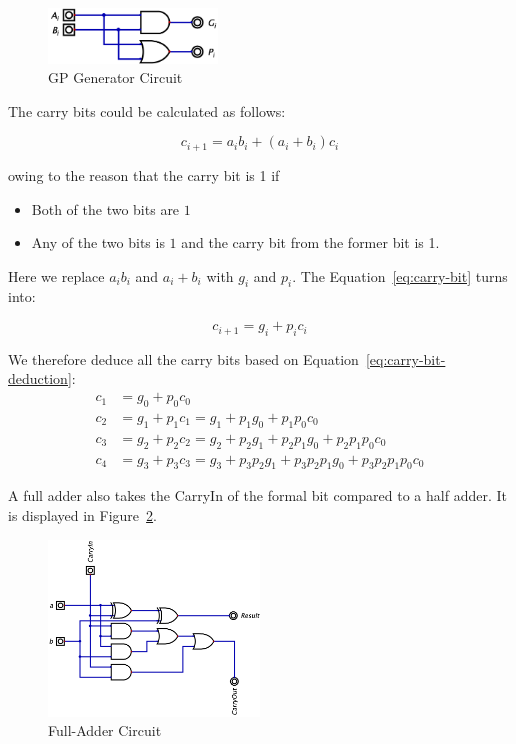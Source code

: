 \documentclass[conference]{IEEEtran}
\begin{document}
\begin{figure}[h!]
\centering
\includegraphics[width=0.4\textwidth]{assets/generate_gp.png}
\caption{GP Generator Circuit}
\label{fig:gp_generator}
\end{figure}

The carry bits could be calculated as follows:

\begin{equation}\label{eq:carry-bit}
    c_{i+1} = a_i b_i + (a_i + b_i) c_i
\end{equation}

owing to the reason that the carry bit is 1 if

\begin{itemize}
    \item Both of the two bits are $1$
    \item Any of the two bits is $1$ and the carry bit from the former bit is 1.
\end{itemize}

Here we replace $a_ib_i$ and $a_i + b_i$ with $g_i$ and $p_i$. The Equation~\ref{eq:carry-bit} turns into:

\begin{equation}\label{eq:carry-bit-deduction}
    c_{i+1} = g_i + p_i c_i
\end{equation}

We therefore deduce all the carry bits based on Equation~\ref{eq:carry-bit-deduction}:
\begin{align}
    c_1 &= g_0 + p_0 c_0 \label{eq:temp1}\\
    c_2 &= g_1 + p_1 c_1 = g_1 + p_1 g_0 + p_1 p_0 c_0 \\
    c_3 &= g_2 + p_2 c_2 = g_2 + p_2 g_1 + p_2 p_1 g_0 + p_2 p_1 p_0 c_0 \\
    c_4 &= g_3 + p_3 c_3 = g_3 + p_3 p_2 g_1 + p_3 p_2 p_1 g_0 + p_3 p_2 p_1 p_0 c_0 \label{eq:temp2}
\end{align}




A full adder also takes the CarryIn of the formal bit compared to a half adder. It is displayed in Figure~\ref{fig:full_adder}. 


\begin{figure}[h!]
    \centering
    \includegraphics[width=0.5\textwidth]{assets/full_adder.png}
    \caption{Full-Adder Circuit}
    \label{fig:full_adder}
\end{figure}
\end{document}
